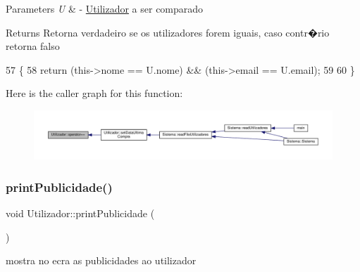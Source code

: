 \begin{DoxyParams}{Parameters}
{\em U} & -\/ \hyperlink{classUtilizador}{Utilizador} a ser comparado \\
\hline
\end{DoxyParams}
\begin{DoxyReturn}{Returns}
Retorna verdadeiro se os utilizadores forem iguais, caso contr�rio retorna falso 
\end{DoxyReturn}

\begin{DoxyCode}
57 \{
58     \textcolor{keywordflow}{return} (this->nome == U.nome) && (this->email == U.email);
59 
60 \}
\end{DoxyCode}
Here is the caller graph for this function\+:
\nopagebreak
\begin{figure}[H]
\begin{center}
\leavevmode
\includegraphics[width=350pt]{classUtilizador_abd73f24d4eb5fa0838af819e8343b1f5_icgraph}
\end{center}
\end{figure}
\mbox{\label{classUtilizador_a4f3016ff86d68d548f801aa569b854dc}} 
\subsubsection{\texorpdfstring{print\+Publicidade()}{printPublicidade()}}
{\footnotesize\ttfamily void Utilizador\+::print\+Publicidade (\begin{DoxyParamCaption}{ }\end{DoxyParamCaption})}



mostra no ecra as publicidades ao utilizador 


